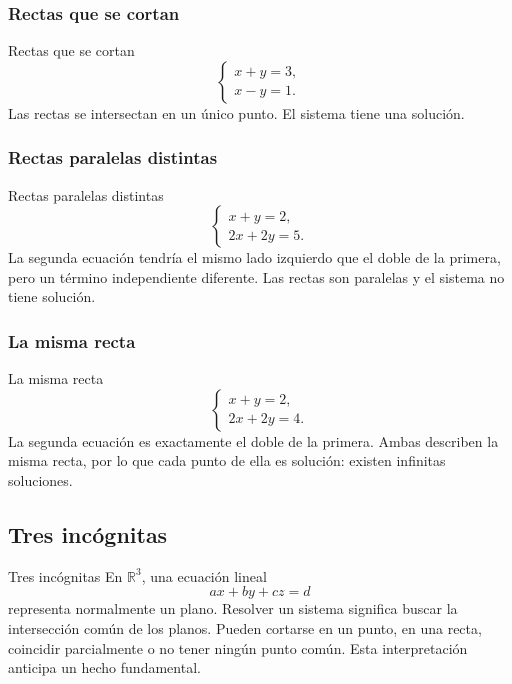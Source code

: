 \documentclass[aspectratio=169,11pt]{beamer}
\theoremstyle{remark}
\newcommand{\R}{\mathbb{R}}
\begin{document}
\subsubsection*{Rectas que se cortan}
\begin{frame}[allowframebreaks]{Rectas que se cortan}
\footnotesize
\[
\begin{cases}
x+y=3,\\
x-y=1.
\end{cases}
\]
Las rectas se intersectan en un único punto. El sistema tiene una solución.
\end{frame}

\subsubsection*{Rectas paralelas distintas}
\begin{frame}[allowframebreaks]{Rectas paralelas distintas}
\footnotesize
\[
\begin{cases}
x+y=2,\\
2x+2y=5.
\end{cases}
\]
La segunda ecuación tendría el mismo lado izquierdo que el doble de la primera, pero un término independiente diferente. Las rectas son paralelas y el sistema no tiene solución.
\end{frame}

\subsubsection*{La misma recta}
\begin{frame}[allowframebreaks]{La misma recta}
\footnotesize
\[
\begin{cases}
x+y=2,\\
2x+2y=4.
\end{cases}
\]
La segunda ecuación es exactamente el doble de la primera. Ambas describen la misma recta, por lo que cada punto de ella es solución: existen infinitas soluciones.
\end{frame}

\subsection*{Tres incógnitas}
\begin{frame}[allowframebreaks]{Tres incógnitas}
\footnotesize
En $\R^3$, una ecuación lineal
\[
ax+by+cz=d
\]
representa normalmente un plano. Resolver un sistema significa buscar la intersección común de los planos. Pueden cortarse en un punto, en una recta, coincidir parcialmente o no tener ningún punto común. Esta interpretación anticipa un hecho fundamental.
\end{frame}
\end{document}
